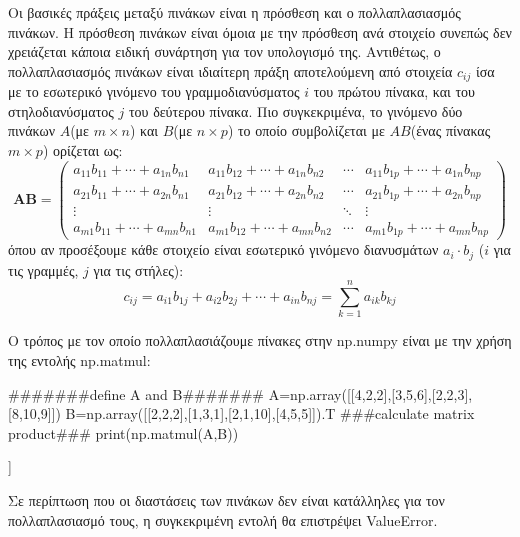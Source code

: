 Οι βασικές πράξεις μεταξύ πινάκων είναι η πρόσθεση και ο πολλαπλασιασμός πινάκων. Η πρόσθεση πινάκων είναι όμοια με την πρόσθεση ανά στοιχείο συνεπώς δεν χρειάζεται κάποια ειδική συνάρτηση για τον υπολογισμό της. Αντιθέτως, ο πολλαπλασιασμός πινάκων είναι ιδιαίτερη πράξη αποτελούμενη από στοιχεία $c_{ij}$ ίσα με το εσωτερικό γινόμενο του γραμμοδιανύσματος $i$ του πρώτου πίνακα, και του στηλοδιανύσματος $j$ του δεύτερου πίνακα. Πιο συγκεκριμένα, το γινόμενο δύο πινάκων $Α$(με $m \times n$) και $Β$(με $n \times p$) το οποίο συμβολίζεται με $ΑΒ$(ένας πίνακας $m \times p$) ορίζεται ως:
\begin{equation}
\mathbf{A}\mathbf{B} = \left(\begin{array}{cccc}
a_{11} b_{11}+\cdots+a_{1 n} b_{n 1} & a_{11} b_{12}+\cdots+a_{1 n} b_{n 2} & \cdots & a_{11} b_{1 p}+\cdots+a_{1 n} b_{n p} \\
a_{21} b_{11}+\cdots+a_{2 n} b_{n 1} & a_{21} b_{12}+\cdots+a_{2 n} b_{n 2} & \cdots & a_{21} b_{1 p}+\cdots+a_{2 n} b_{n p} \\
\vdots & \vdots & \ddots & \vdots \\
a_{m 1} b_{11}+\cdots+a_{m n} b_{n 1} & a_{m 1} b_{12}+\cdots+a_{m n} b_{n 2} & \cdots & a_{m 1} b_{1 p}+\cdots+a_{m n} b_{n p}
\end{array}\right)
\end{equation}
όπου αν προσέξουμε κάθε στοιχείο είναι εσωτερικό γινόμενο διανυσμάτων $a_i \cdot b_j$ ($i$ για τις γραμμές, $j$ για τις στήλες):
\begin{equation}
c_{i j}=a_{i 1} b_{1 j}+a_{i 2} b_{2 j}+\cdots+a_{i n} b_{n j}=\sum_{k=1}^n a_{i k} b_{k j}
\end{equation}

Ο τρόπος με τον οποίο πολλαπλασιάζουμε πίνακες στην {\en np.numpy} είναι με την χρήση της εντολής {\en np.matmul}:
\en
\begin{python}
#######define A and B#######
A=np.array([[4,2,2],[3,5,6],[2,2,3],[8,10,9]])
B=np.array([[2,2,2],[1,3,1],[2,1,10],[4,5,5]]).T
###calculate matrix product###
print(np.matmul(A,B))
\end{python}
\vspace*{-0.7cm}
\begin{codeout}
[[ 16  12  30  36]
 [ 28  24  71  67]
 [ 14  11  36  33]
 [ 54  47 116 127]]
\end{codeout}
\gr
Σε περίπτωση που οι διαστάσεις των πινάκων δεν είναι κατάλληλες για τον πολλαπλασιασμό τους, η συγκεκριμένη εντολή θα επιστρέψει {\en ValueError}. 

